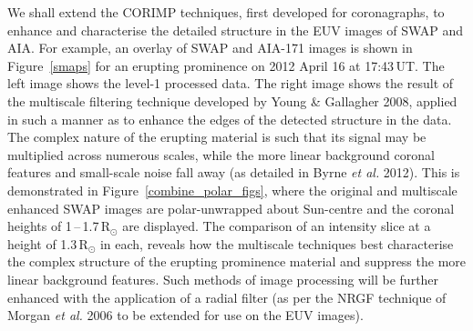 \documentclass[preprint2]{aastex}
\begin{document}
We shall extend the CORIMP techniques, first developed for coronagraphs, to enhance and characterise the detailed structure in the EUV images of SWAP and AIA. For example, an overlay of SWAP and AIA-171 images is shown in Figure~\ref{smaps} for an erupting prominence on 2012 April 16 at 17:43\,UT. The left image shows the level-1 processed data. The right image shows the result of the multiscale filtering technique developed by Young \& Gallagher 2008, applied in such a manner as to enhance the edges of the detected structure in the data. The complex nature of the erupting material is such that its signal may be multiplied across numerous scales, while the more linear background coronal features and small-scale noise fall away (as detailed in Byrne \emph{et al.} 2012). This is demonstrated in Figure~\ref{combine_polar_figs}, where the original and multiscale enhanced SWAP images are polar-unwrapped about Sun-centre and the coronal heights of 1\,--\,1.7\,R$_\odot$ are displayed. The comparison of an intensity slice at a height of 1.3\,R$_\odot$ in each, reveals how the multiscale techniques best characterise the complex structure of the erupting prominence material and suppress the more linear background features. Such methods of image processing will be further enhanced with the application of a radial filter (as per the NRGF technique of Morgan \emph{et al.} 2006 to be extended for use on the EUV images).
\end{document}
